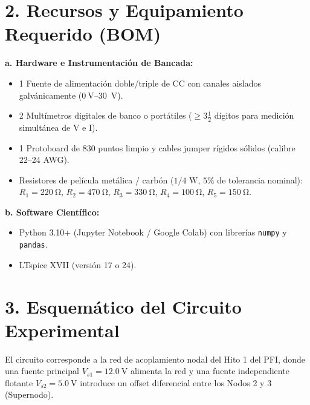 \documentclass[11pt, a4paper]{article}
\begin{document}
\section{2. Recursos y Equipamiento Requerido (BOM)}
\textbf{a. Hardware e Instrumentación de Bancada:}
\begin{itemize}[label=\raisebox{0.25ex}{\tiny$\bullet$}, itemsep=0pt]
    \item 1 Fuente de alimentación doble/triple de CC con canales aislados galvánicamente ($\qty{0}{\volt}$--\qty{30}{\volt}).
    \item 2 Multímetros digitales de banco o portátiles ($\ge 3\frac{1}{2}$ dígitos para medición simultánea de V e I).
    \item 1 Protoboard de 830 puntos limpio y cables jumper rígidos sólidos (calibre 22--24 AWG).
    \item Resistores de película metálica / carbón ($1/4\text{ W}$, $5\%$ de tolerancia nominal): \\
    $R_1 = \qty{220}{\ohm}$, $R_2 = \qty{470}{\ohm}$, $R_3 = \qty{330}{\ohm}$, $R_4 = \qty{100}{\ohm}$, $R_5 = \qty{150}{\ohm}$.
\end{itemize}

\textbf{b. Software Científico:}
\begin{itemize}[label=\raisebox{0.25ex}{\tiny$\bullet$}, itemsep=0pt]
    \item Python 3.10+ (Jupyter Notebook / Google Colab) con librerías \texttt{numpy} y \texttt{pandas}.
    \item LTspice XVII (versión 17 o 24).
\end{itemize}

\section{3. Esquemático del Circuito Experimental}
El circuito corresponde a la red de acoplamiento nodal del Hito 1 del PFI, donde una fuente principal $V_{s1} = \qty{12.0}{\volt}$ alimenta la red y una fuente independiente flotante $V_{s2} = \qty{5.0}{\volt}$ introduce un offset diferencial entre los Nodos 2 y 3 (Supernodo).
\end{document}
